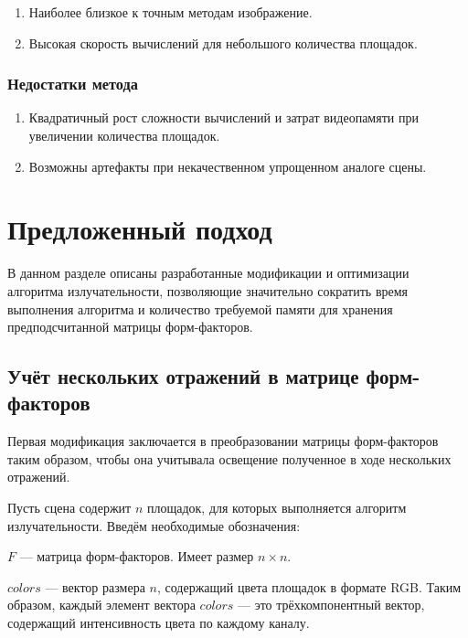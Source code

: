 \documentclass[12pt,fleqn]{article}
\begin{document}
\begin{enumerate}

\item Наиболее близкое к точным методам изображение.

\item Высокая скорость вычислений для небольшого количества площадок.

\end{enumerate}

\subsubsection{Недостатки метода}

\begin{enumerate}

\item Квадратичный рост сложности вычислений и затрат видеопамяти при увеличении количества площадок.

\item Возможны артефакты при некачественном упрощенном аналоге сцены.

\end{enumerate}

\pagebreak

\section{Предложенный подход}

В данном разделе описаны разработанные модификации и оптимизации алгоритма излучательности, позволяющие значительно сократить время выполнения алгоритма и количество требуемой памяти для хранения предподсчитанной матрицы форм-факторов.

\subsection{Учёт нескольких отражений в матрице форм-факторов}

Первая модификация заключается в преобразовании матрицы форм-факторов таким образом, чтобы она учитывала освещение полученное в ходе нескольких отражений.

Пусть сцена содержит $n$ площадок, для которых выполняется алгоритм излучательности. Введём необходимые обозначения:

$F$ --- матрица форм-факторов. Имеет размер $n \times n$.

$colors$ --- вектор размера $n$, содержащий цвета площадок в формате RGB. Таким образом, каждый элемент вектора $colors$ --- это трёхкомпонентный вектор, содержащий интенсивность цвета по каждому каналу.
\end{document}
